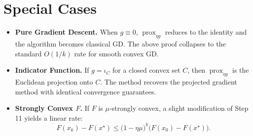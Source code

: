 \documentclass{article}
\newcommand{\prox}{\operatorname{prox}}
\begin{document}
\section*{Special Cases}
\begin{itemize}
\item \textbf{Pure Gradient Descent.} When $g\equiv0$, $\prox_{\eta g}$ reduces to the identity and the algorithm becomes classical GD. The above proof collapses to the standard $O(1/k)$ rate for smooth convex GD.
\item \textbf{Indicator Function.} If $g=\iota_{C}$ for a closed convex set $C$, then $\prox_{\eta g}$ is the Euclidean projection onto $C$. The method recovers the projected gradient method with identical convergence guarantees.
\item \textbf{Strongly Convex $F$.} If $F$ is $\mu$‑strongly convex, a slight modification of Step 11 yields a linear rate:
\[
F(x_{k})-F(x^{\star})\le\bigl(1-\eta\mu\bigr)^{k}\bigl(F(x_{0})-F(x^{\star})\bigr).
\]
\end{itemize}
\end{document}
